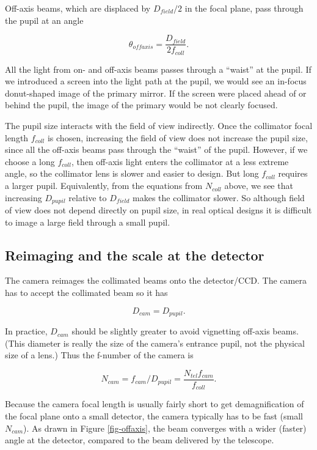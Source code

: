 \documentclass[12pt]{article}
\begin{document}
Off-axis beams, which are displaced by 
$D_{field}/2$ in the focal plane, pass through the pupil at an angle

$$ \theta_{offaxis} = \frac{D_{field}}{2f_{coll}}. $$

All the light from on- and off-axis beams passes 
through a ``waist'' at the pupil.  If we introduced a 
screen into the light path at the pupil, we would see an in-focus
donut-shaped image of the primary mirror.  If the screen
were placed ahead of or behind the pupil, the image of the primary
would be not clearly focused.  

The pupil size interacts with the field of view indirectly.
Once the collimator focal length $f_{coll}$ is chosen, increasing the 
field of view does not increase the pupil size, since all
the off-axis beams pass through the ``waist'' of the pupil.
However, if we choose a
long $f_{coll}$, then off-axis light enters the collimator at
a less extreme angle, so the collimator lens is slower and
easier to design.  But long $f_{coll}$ requires a larger
pupil.  Equivalently, from the equations from $N_{coll}$ above,
we see that increasing $D_{pupil}$ relative to $D_{field}$ makes
the collimator slower.  So although field of view does not
depend directly on pupil size, in real optical designs
it is difficult to
image a large field through a small pupil.

\subsection{Reimaging and the scale at the detector}

The camera reimages the collimated beams onto the detector/CCD.
The camera has to accept the collimated beam so it has

$$ D_{cam} = D_{pupil}. $$

In practice, $D_{cam}$ should be slightly greater to avoid 
vignetting off-axis beams.  (This diameter is really the size of the
camera's entrance pupil, not the physical size of a lens.)  
Thus the f-number of the camera is 

$$ N_{cam} = f_{cam} / D_{pupil} = \frac{N_{tel} f_{cam}}{f_{coll}}. $$

Because the camera focal length is usually fairly short to
get demagnification of the focal plane onto a small detector,
the camera typically has to be fast (small $N_{cam}$).  As drawn in Figure
\ref{fig-offaxis}, the beam converges with a wider (faster) angle
at the detector, compared to the beam delivered by the telescope.
\end{document}
